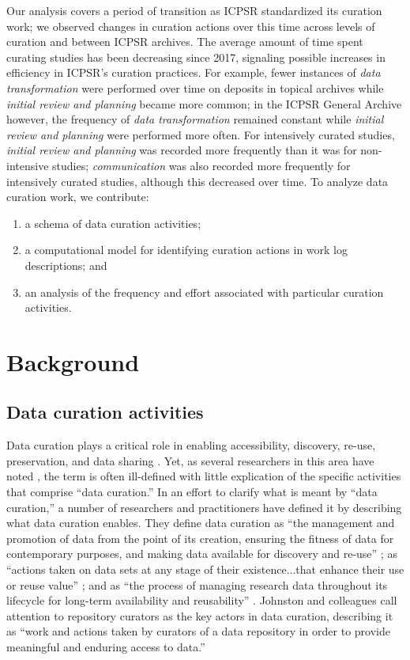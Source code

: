\documentclass[conference]{IEEEtran}
\begin{document}
Our analysis covers a period of transition as ICPSR standardized its curation work; we observed changes in curation actions over this time across levels of curation and between ICPSR archives. The average amount of time spent curating studies has been decreasing since 2017, signaling possible increases in efficiency in ICPSR’s curation practices. For example, fewer instances of \textit{data transformation} were performed over time on deposits in topical archives while \textit{initial review and planning} became more common; in the ICPSR General Archive however, the frequency of \textit{data transformation} remained constant while \textit{initial review and planning} were performed more often. For intensively curated studies, \textit{initial review and planning} was recorded more frequently than it was for non-intensive studies; \textit{communication} was also recorded more frequently for intensively curated studies, although this decreased over time. To analyze data curation work, we contribute:  

\begin{enumerate}
    \item  a schema of data curation activities; 
    \item  a computational model for identifying curation actions in work log descriptions; and
    \item an analysis of the frequency and effort associated with particular curation activities.
\end{enumerate}

\section{Background}
\label{background}

\subsection{Data curation activities}
\label{data-curation-activities}
Data curation plays a critical role in enabling accessibility, discovery, re-use, preservation, and data sharing \cite{Tenopir2011-an}. Yet, as several researchers in this area have noted \cite{Carlson2012-lb, Pham2018-ob}, the term is often ill-defined with little explication of the specific activities that comprise “data curation.” In an effort to clarify what is meant by “data curation,” a number of researchers and practitioners have defined it by describing what data curation enables. They define data curation as “the management and promotion of data from the point of its creation, ensuring the fitness of data for contemporary purposes, and making data available for discovery and re-use” \cite{Carpenter2004-wg, Carlson2012-lb}; as “actions taken on data sets at any stage of their existence...that enhance their use or reuse value” \cite{Darch2020-rx}; and as “the process of managing research data throughout its lifecycle for long-term availability and reusability” \cite{Lee2017-be}. Johnston and colleagues \cite{Johnston2018-gy} call attention to repository curators as the key actors in data curation, describing it as “work and actions taken by curators of a data repository in order to provide meaningful and enduring access to data.” 
\end{document}
